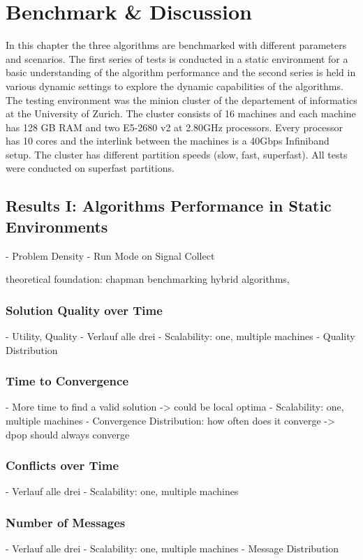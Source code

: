 \chapter{Benchmark \& Discussion}

In this chapter the three algorithms are benchmarked with different parameters and scenarios. The first series of tests is conducted in a static environment for a basic understanding of the algorithm performance and the second series is held in various dynamic settings to explore the dynamic capabilities of the algorithms. The testing environment was the minion cluster of the departement of informatics at the University of Zurich. The cluster consists of 16 machines and each machine has 128 GB RAM and two E5-2680 v2 at 2.80GHz processors. Every processor has 10 cores and the interlink between the machines is a 40Gbps Infiniband setup. The cluster has different partition speeds (slow, fast, superfast). All tests were conducted on superfast partitions.

\section{Results I: Algorithms Performance in Static Environments}

- Problem Density
- Run Mode on Signal Collect

theoretical foundation: chapman benchmarking hybrid algorithms,

\subsection{Solution Quality over Time}
- Utility, Quality
- Verlauf alle drei
- Scalability: one, multiple machines
- Quality Distribution

\subsection{Time to Convergence}
- More time to find a valid solution -> could be local optima
- Scalability: one, multiple machines
- Convergence Distribution: how often does it converge -> dpop should always converge

\subsection{Conflicts over Time}
- Verlauf alle drei
- Scalability: one, multiple machines
\subsection{Number of Messages}
-  Verlauf alle drei
- Scalability: one, multiple machines
- Message Distribution

